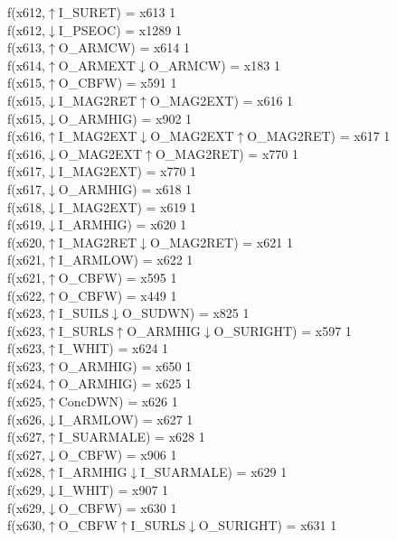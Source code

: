f(x612,$\uparrow$I\_SURET) = x613 {1} \\
f(x612,$\downarrow$I\_PSEOC) = x1289 {1} \\
f(x613,$\uparrow$O\_ARMCW) = x614 {1} \\
f(x614,$\uparrow$O\_ARMEXT$\downarrow$O\_ARMCW) = x183 {1} \\
f(x615,$\uparrow$O\_CBFW) = x591 {1} \\
f(x615,$\downarrow$I\_MAG2RET$\uparrow$O\_MAG2EXT) = x616 {1} \\
f(x615,$\downarrow$O\_ARMHIG) = x902 {1} \\
f(x616,$\uparrow$I\_MAG2EXT$\downarrow$O\_MAG2EXT$\uparrow$O\_MAG2RET) = x617 {1} \\
f(x616,$\downarrow$O\_MAG2EXT$\uparrow$O\_MAG2RET) = x770 {1} \\
f(x617,$\downarrow$I\_MAG2EXT) = x770 {1} \\
f(x617,$\downarrow$O\_ARMHIG) = x618 {1} \\
f(x618,$\downarrow$I\_MAG2EXT) = x619 {1} \\
f(x619,$\downarrow$I\_ARMHIG) = x620 {1} \\
f(x620,$\uparrow$I\_MAG2RET$\downarrow$O\_MAG2RET) = x621 {1} \\
f(x621,$\uparrow$I\_ARMLOW) = x622 {1} \\
f(x621,$\uparrow$O\_CBFW) = x595 {1} \\
f(x622,$\uparrow$O\_CBFW) = x449 {1} \\
f(x623,$\uparrow$I\_SUILS$\downarrow$O\_SUDWN) = x825 {1} \\
f(x623,$\uparrow$I\_SURLS$\uparrow$O\_ARMHIG$\downarrow$O\_SURIGHT) = x597 {1} \\
f(x623,$\uparrow$I\_WHIT) = x624 {1} \\
f(x623,$\uparrow$O\_ARMHIG) = x650 {1} \\
f(x624,$\uparrow$O\_ARMHIG) = x625 {1} \\
f(x625,$\uparrow$ConcDWN) = x626 {1} \\
f(x626,$\downarrow$I\_ARMLOW) = x627 {1} \\
f(x627,$\uparrow$I\_SUARMALE) = x628 {1} \\
f(x627,$\downarrow$O\_CBFW) = x906 {1} \\
f(x628,$\uparrow$I\_ARMHIG$\downarrow$I\_SUARMALE) = x629 {1} \\
f(x629,$\downarrow$I\_WHIT) = x907 {1} \\
f(x629,$\downarrow$O\_CBFW) = x630 {1} \\
f(x630,$\uparrow$O\_CBFW$\uparrow$I\_SURLS$\downarrow$O\_SURIGHT) = x631 {1} \\
